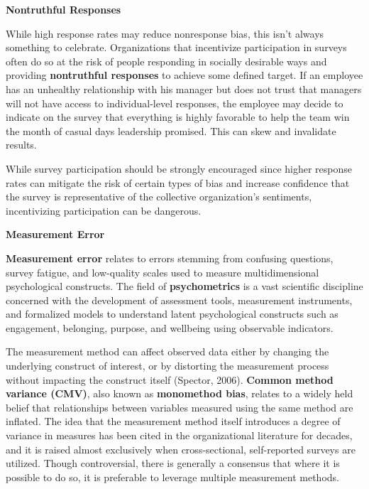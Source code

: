 \documentclass[
]{book}
\begin{document}
\textbf{Nontruthful Responses}

While high response rates may reduce nonresponse bias, this isn't always something to celebrate. Organizations that incentivize participation in surveys often do so at the risk of people responding in socially desirable ways and providing \textbf{nontruthful responses} to achieve some defined target. If an employee has an unhealthy relationship with his manager but does not trust that managers will not have access to individual-level responses, the employee may decide to indicate on the survey that everything is highly favorable to help the team win the month of casual days leadership promised. This can skew and invalidate results.

While survey participation should be strongly encouraged since higher response rates can mitigate the risk of certain types of bias and increase confidence that the survey is representative of the collective organization's sentiments, incentivizing participation can be dangerous.

\textbf{Measurement Error}

\textbf{Measurement error} relates to errors stemming from confusing questions, survey fatigue, and low-quality scales used to measure multidimensional psychological constructs. The field of \textbf{psychometrics} is a vast scientific discipline concerned with the development of assessment tools, measurement instruments, and formalized models to understand latent psychological constructs such as engagement, belonging, purpose, and wellbeing using observable indicators.

The measurement method can affect observed data either by changing the underlying construct of interest, or by distorting the measurement process without impacting the construct itself (Spector, 2006). \textbf{Common method variance (CMV)}, also known as \textbf{monomethod bias}, relates to a widely held belief that relationships between variables measured using the same method are inflated. The idea that the measurement method itself introduces a degree of variance in measures has been cited in the organizational literature for decades, and it is raised almost exclusively when cross-sectional, self-reported surveys are utilized. Though controversial, there is generally a consensus that where it is possible to do so, it is preferable to leverage multiple measurement methods.
\end{document}
